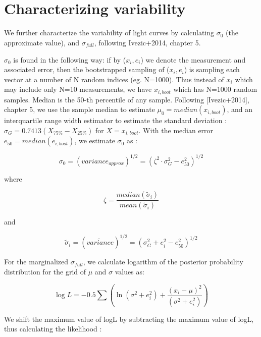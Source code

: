 \documentclass[fleqn,usenatbib]{mnras}  %
\begin{document}
\appendix
\section{\\ Characterizing variability}
\label{sec:variability}


We further characterize the variability of light curves by calculating $\sigma_{0}$ (the approximate value), and $\sigma_{full}$, following Ivezic+2014, chapter 5. 

$\sigma_{0}$ is found in the following way: if by ($x_{i}, e_{i}$) we denote the measurement and associated error, then the bootstrapped sampling of ($x_{i}, e_{i}$) is sampling each vector at a number of N random indices (eg. N=1000). Thus instead of $x_{i}$ which may include only N=10 measurements, we have $x_{i,boot}$ which has N=1000 random samples. Median is the 50-th percentile of any sample.  Following [Ivezic+2014], chapter 5, we use the sample median to estimate $\mu_{0} = median(x_{i,boot})$, and an interquartile range width estimator to estimate the standard deviation : $\sigma_{G} =0.7413 (X_{75\%} - X_{25\%}) $ for $X = x_{i,boot}$.
With the median error $e_{50} = median(e_{i,boot})$, we estimate $\sigma_{0}$ as : 

\begin{equation}
\sigma_{0} = ( variance_{approx} )^{1/2} = (\zeta^{2} \cdot \sigma_{G}^{2} - e_{50} ^ {2})^{1/2}
\end{equation}

where 

\begin{equation}
\zeta = \frac{median(\widetilde{\sigma}_{i})} {mean(\widetilde{\sigma}_{i})}
\end{equation}

and 

\begin{equation}
\widetilde{\sigma}_{i} =  ( \widetilde{variance} )^{1/2} = ( \sigma_{G}^{2} + e_{i}^{2} - e_{50}^{2} )^{1/2}
\end{equation}


For the marginalized $\sigma_{full}$, we calculate logarithm of the posterior probability distribution for the grid of $\mu$ and $\sigma$ values as:

\begin{equation}
\log{L} = -0.5 \sum \left( \ln(\sigma^{2}+e_{i}^{2}) + \frac{(x_{i}-\mu)^{2}}{(\sigma^{2}+e_{i}^{2})} \right)
\end{equation}

We shift the maximum value of logL by subtracting the maximum value of logL, thus calculating the likelihood : 
\end{document}
